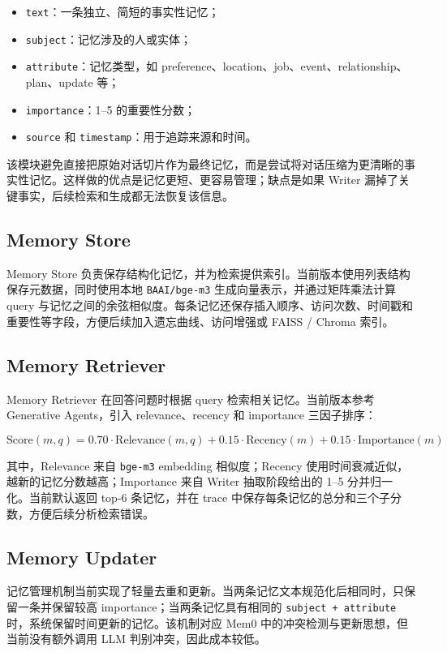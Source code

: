 \documentclass[UTF8,a4paper,11pt]{ctexart}
\begin{document}
\begin{itemize}
  \item \texttt{text}：一条独立、简短的事实性记忆；
  \item \texttt{subject}：记忆涉及的人或实体；
  \item \texttt{attribute}：记忆类型，如 preference、location、job、event、relationship、plan、update 等；
  \item \texttt{importance}：1--5 的重要性分数；
  \item \texttt{source} 和 \texttt{timestamp}：用于追踪来源和时间。
\end{itemize}

该模块避免直接把原始对话切片作为最终记忆，而是尝试将对话压缩为更清晰的事实性记忆。这样做的优点是记忆更短、更容易管理；缺点是如果 Writer 漏掉了关键事实，后续检索和生成都无法恢复该信息。

\subsection{Memory Store}

Memory Store 负责保存结构化记忆，并为检索提供索引。当前版本使用列表结构保存元数据，同时使用本地 \texttt{BAAI/bge-m3} 生成向量表示，并通过矩阵乘法计算 query 与记忆之间的余弦相似度。每条记忆还保存插入顺序、访问次数、时间戳和重要性等字段，方便后续加入遗忘曲线、访问增强或 FAISS / Chroma 索引。

\subsection{Memory Retriever}

Memory Retriever 在回答问题时根据 query 检索相关记忆。当前版本参考 Generative Agents，引入 relevance、recency 和 importance 三因子排序：

\[
\mathrm{Score}(m, q)
= 0.70 \cdot \mathrm{Relevance}(m, q)
+ 0.15 \cdot \mathrm{Recency}(m)
+ 0.15 \cdot \mathrm{Importance}(m)
\]

其中，Relevance 来自 \texttt{bge-m3} embedding 相似度；Recency 使用时间衰减近似，越新的记忆分数越高；Importance 来自 Writer 抽取阶段给出的 1--5 分并归一化。当前默认返回 top-6 条记忆，并在 trace 中保存每条记忆的总分和三个子分数，方便后续分析检索错误。

\subsection{Memory Updater}

记忆管理机制当前实现了轻量去重和更新。当两条记忆文本规范化后相同时，只保留一条并保留较高 importance；当两条记忆具有相同的 \texttt{subject + attribute} 时，系统保留时间更新的记忆。该机制对应 Mem0 中的冲突检测与更新思想，但当前没有额外调用 LLM 判别冲突，因此成本较低。
\end{document}
